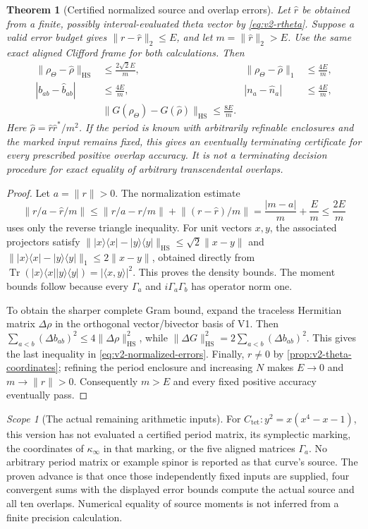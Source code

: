 \documentclass[11pt]{article}
\newtheorem{theorem}{Theorem}[section]
\theoremstyle{definition}
\theoremstyle{remark}
\newtheorem{scope}[scope]{Scope}
\newcommand{\Tr}{\operatorname{Tr}}
\newcommand{\HS}{\mathrm{HS}}
\newcommand{\norm}[1]{\lVert#1\rVert}
\newcommand{\ip}[2]{\langle#1,#2\rangle}
\newcommand{\ketbra}[1]{|#1\rangle\langle#1|}
\begin{document}
\begin{theorem}[Certified normalized source and overlap errors]
\label{thm:v2-normalized-theta}
Let $\widehat r$ be obtained from a finite, possibly interval-evaluated theta
vector by \eqref{eq:v2-rtheta}. Suppose a valid error budget gives
$\norm{r-\widehat r}_2\le E$, and let $m=\norm{\widehat r}_2>E$.
Use the same exact aligned Clifford frame for both calculations. Then
\begin{align}
 \norm{\rho_\Theta-\widehat\rho}_{\HS}
 &\le\frac{2\sqrt2 E}{m},&
 \norm{\rho_\Theta-\widehat\rho}_1&\le\frac{4E}{m},\\
 |b_{ab}-\widehat b_{ab}|&\le\frac{4E}{m},&
 |n_a-\widehat n_a|&\le\frac{4E}{m},\\
 &\boxed{\norm{G(\rho_\Theta)-G(\widehat\rho)}_{\HS}\le\frac{8E}{m}.}
 \label{eq:v2-normalized-errors}
\end{align}
Here $\widehat\rho=\widehat r\widehat r^*/m^2$. If the period is known
with arbitrarily refinable enclosures and the marked input remains fixed,
this gives an eventually terminating certificate for every prescribed
positive overlap accuracy. It is not a terminating decision procedure for
exact equality of arbitrary transcendental overlaps.
\end{theorem}
\begin{proof}
Let $a=\norm r>0$. The normalization estimate
\[
 \norm{r/a-\widehat r/m}
 \le\norm{r/a-r/m}+\norm{(r-\widehat r)/m}
 =\frac{|m-a|}{m}+\frac E m\le\frac{2E}{m}
\]
uses only the reverse triangle inequality. For unit vectors $x,y$, the
associated projectors satisfy
$\norm{\ketbra x-\ketbra y}_{\HS}\le\sqrt2\norm{x-y}$ and
$\norm{\ketbra x-\ketbra y}_1\le2\norm{x-y}$, obtained directly from
$\Tr(\ketbra x\ketbra y)=|\ip{x}{y}|^2$. This proves the density bounds.
The moment bounds follow because every $\Gamma_a$ and $i\Gamma_a\Gamma_b$
has operator norm one.

To obtain the sharper complete Gram bound, expand the traceless Hermitian
matrix $\Delta\rho$ in the orthogonal vector/bivector basis of V1. Then
$\sum_{a<b}(\Delta b_{ab})^2\le4\norm{\Delta\rho}_{\HS}^2$, while
$\norm{\Delta G}_{\HS}^2=2\sum_{a<b}(\Delta b_{ab})^2$.
This gives the last inequality in \eqref{eq:v2-normalized-errors}.
Finally, $r\ne0$ by \cref{prop:v2-theta-coordinates}; refining the period
enclosure and increasing $N$ makes $E\to0$ and $m\to\norm r>0$.
Consequently $m>E$ and every fixed positive accuracy eventually pass.
\end{proof}

\begin{scope}[The actual remaining arithmetic inputs]
For $C_{\mathrm{tet}}:y^2=x(x^4-x-1)$, this version has not evaluated a
certified period matrix, its symplectic marking, the coordinates of
$\kappa_\infty$ in that marking, or the five aligned matrices $\Gamma_a$.
No arbitrary period matrix or example spinor is reported as that curve's
source. The proven advance is that once those independently fixed inputs
are supplied, four convergent sums with the displayed error bounds compute
the actual source and all ten overlaps. Numerical equality of source
moments is not inferred from a finite precision calculation.
\end{scope}
\end{document}
